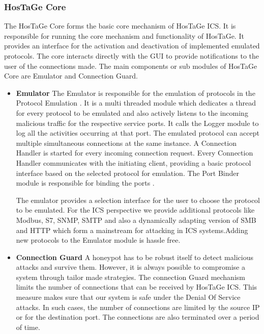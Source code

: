 \documentclass[article,msc=informatik,type=msc,colorback,accentcolor=tud9c]{tudthesis}
\begin{document}
       
       
       \vspace{5mm} 
      \subsubsection{HosTaGe Core} \label{HosTaGe Core}
      The HosTaGe Core forms the basic core mechanism of HosTaGe ICS. It is responsible for running the core mechanism and functionality of HosTaGe. It provides an interface for the activation and deactivation of implemented emulated protocols. The core interacts directly with the \ac{GUI} to provide notifications to the user of the connections made. The main components or sub modules of HosTaGe Core are Emulator and Connection Guard.
       
       \begin{itemize}
       
       \item\textbf{Emulator}
       The Emulator is responsible for the emulation of protocols in the Protocol Emulation . It is a multi threaded module which dedicates a thread for every protocol to be emulated and also actively listens to the incoming malicious traffic for the respective service ports. It calls the Logger module to log all the activities occurring at that port. The emulated protocol can accept multiple simultaneous connections at the same instance. A Connection Handler is started for every incoming connection request. Every Connection Handler communicates with the initiating client, providing a basic protocol interface based on the selected protocol for emulation. The Port Binder module is responsible for binding the ports . 
       
       The emulator provides a selection interface for the user to choose the protocol to be emulated. For the \ac{ICS} perspective we provide additional protocols like Modbus, S7, \ac{SNMP}, \ac{SMTP} and also a dynamically adapting version of \ac{SMB} and \ac{HTTP} which form a mainstream for attacking in \ac{ICS} systems.Adding new protocols to the Emulator module is hassle free. 
       
       
       \item\textbf{Connection Guard}
       A honeypot has to be robust itself to detect malicious attacks and survive them. However, it is always possible to compromise a system through tailor made strategies. The connection Guard mechanism limits the number of connections that can be received by HosTaGe ICS. This measure makes sure that our system is safe under the Denial Of Service attacks. In such cases, the number of connections are limited by the source \ac{IP} or for the destination port. The connections are also terminated over a period of time. 
       
       \end {itemize}
       \vspace{5mm} 
\end{document}
